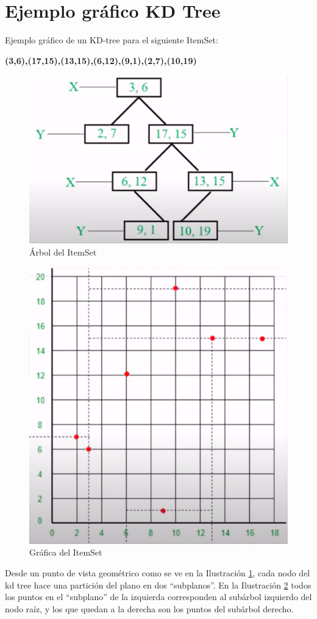 \documentclass{cosas/tfg_domingo}
\begin{document}
\newpage
\section{Ejemplo gráfico KD Tree}

\hfill

Ejemplo gráfico de un KD-tree para el siguiente ItemSet:

\textbf{{(3,6),(17,15),(13,15),(6,12),(9,1),(2,7),(10,19)}}

\hfill

\begin{figure}[h]
\begin{center}
\includegraphics[width=.4\linewidth]{imagenes/kdtree1.png}
\end{center}
\caption{Árbol del ItemSet}
\label{arbol_kd}
\end{figure}

\begin{figure}[h]
\begin{center}
\includegraphics[width=.4\linewidth]{imagenes/kdtree2.png}
\end{center}
\caption{Gráfica del ItemSet}
\label{grafica_kd}
\end{figure}

Desde un punto de vista geométrico como se ve en la Ilustración \ref{arbol_kd}, cada nodo del kd tree hace una partición del plano en dos “subplanos”. En la Ilustración \ref{grafica_kd} todos los puntos en el “subplano” de la izquierda corresponden al subárbol izquierdo del nodo raíz, y los que quedan a la derecha son los puntos del subárbol derecho.
\end{document}

